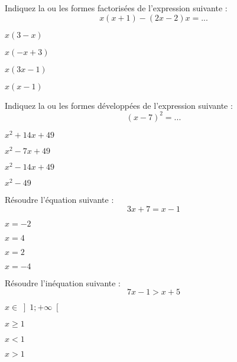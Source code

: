 \documentclass[a4paper,10pt]{article}
\begin{document}
\begin{qcm}
	\q{} Indiquez la ou les formes factorisées de l'expression suivante : $$x(x+1)-(2x-2)x=...$$
	\begin{choix2col}
		\item $x(3-x)$
		\item $x(-x+3)$
		\item $x(3x-1)$
		\item $x(x-1)$
	\end{choix2col}
	
	\espace
	
	\q{} Indiquez la ou les formes développées de l'expression suivante : $$(x-7)^2=...$$
	\begin{choix2col}
		\item $x^2+14x+49$
		\item $x^2-7x+49$
		\item $x^2-14x+49$
		\item $x^2-49$
	\end{choix2col}
	
	\q{} Résoudre l'équation suivante : $$3x+7=x-1$$
	\begin{choix2col}
		\item $x=-2$
		\item $x=4$
		\item $x=2$
		\item $x=-4$
	\end{choix2col}
	
	\q{} Résoudre l'inéquation suivante : $$7x-1>x+5$$
	\begin{choix2col}
		\item $x\in\left]1;+\infty\right[$
		\item $x\geq 1$
		\item $x<1$
		\item $x>1$
	\end{choix2col}
\end{qcm}
\end{document}
